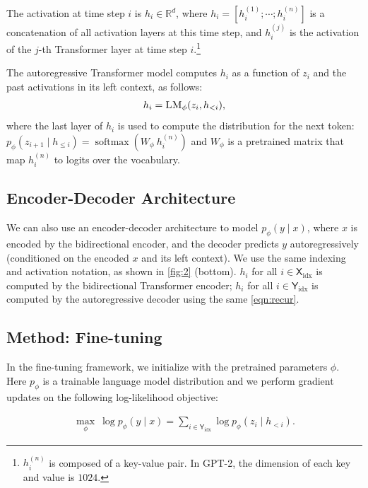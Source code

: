 \documentclass[11pt,a4paper]{article}
\newcommand{\exper}[1]{\textsc{#1}}
\newcommand{\LM}{\exper{LM}}
\newcommand{\sep}{\exper{SEP}}
\newcommand{\xx}{\textsf{X$_{\text{idx}}$}}
\newcommand{\yy}{\textsf{Y$_{\text{idx}}$}}
\DeclareMathOperator{\Softmax}{softmax}
\newcommand\pl[1]{\textcolor{red}{[PL: #1]}}
\newcommand\lisa[1]{\textcolor{blue}{[Lisa: #1]}}
\begin{document}
The activation at time step $i$ is $h_i \in \mathbb R^d$, where $h_i = [h_i^{(1)}; \cdots ; h_i^{(n)}]$ is a concatenation of all activation layers at this time step, and $h_i^{(j)}$ is the activation of the $j$-th Transformer layer at time step $i$.\footnote{$h_i^{(n)}$ is composed of a key-value pair. In GPT-2, the dimension of each key and value is $1024$.} 

The autoregressive Transformer model computes $h_i$ as a function of $z_i$ and the past activations in its left context, as follows: 
\begin{align}
h_i = \LM_\phi(z_i, h_{<i}) \text{,}
\label{eqn:recur}
\end{align}
where the last layer of $h_i$ is used to compute the distribution for the next token: $p_{\phi}(z_{i+1} \mid h_{\leq i}) = \Softmax(W_\phi ~h_{i}^{(n)})$
and $W_\phi$ is a pretrained matrix that map $h_{i}^{(n)}$ to logits over the vocabulary. 

\subsection{Encoder-Decoder Architecture}
We can also use an encoder-decoder architecture \citep[e.g., BART;][]{lewis-etal-2020-bart} to model $p_\phi(y\mid x)$, where $x$ is encoded by the bidirectional encoder, and the decoder predicts $y$ autoregressively (conditioned on the encoded $x$ and its left context). We use the same indexing and activation notation, as shown in \cref{fig:2} (bottom). 
$h_i$ for all $i \in \xx$ is computed by the bidirectional Transformer encoder; 
$h_i$ for all $i \in \yy$ is computed by the autoregressive decoder using the same \cref{eqn:recur}. 




\subsection{Method: Fine-tuning}
In the fine-tuning framework, we initialize with the pretrained parameters $\phi$. Here $p_{\phi}$ is a trainable language model distribution and we perform gradient updates on the following log-likelihood objective:

\begin{align}
    \max_{\phi} ~\log p_\phi(y \mid x) = \sum_{i\in \yy}  \log p_\phi(z_i \mid h_{<i}) \text{.}
    \label{eqn:loss}
\end{align}
\end{document}
